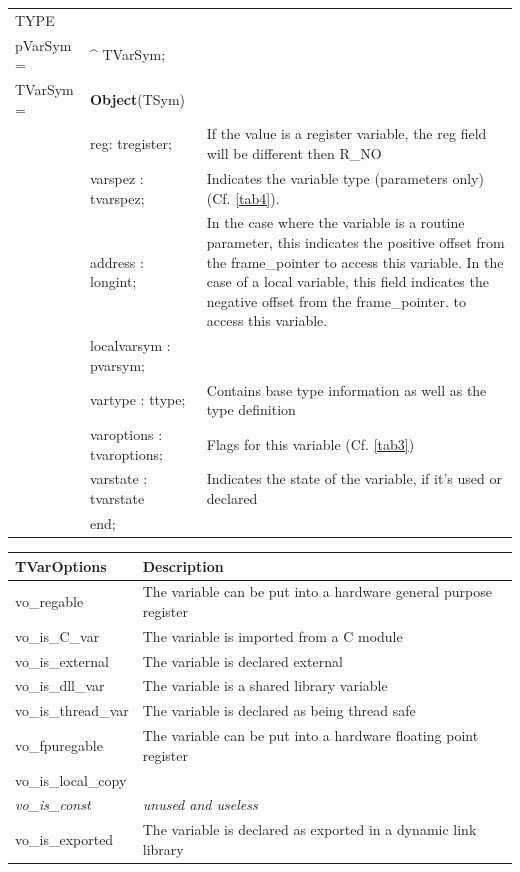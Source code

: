 \documentclass [12pt]{article}
\begin{document}
\begin{tabular*}{6.5in}{|l@{\extracolsep{\fill}}lp{9cm}|}
\hline
\textsf{TYPE}& & \\
\xspace pVarSym = & \^{}  TVarSym; & \\
\xspace \textsf{TVarSym} = & \textbf{Object}(TSym) & \\
& \textsf{reg: tregister;}& 
	If the value is a register variable, the \textsf{reg} field will be
	different then R{\_}NO \\
& \textsf{varspez : tvarspez;}& 
	Indicates the variable type (parameters only) (Cf. \ref{tab4}). \\
& \textsf{address : longint;}& 
	In the case where the variable is a routine parameter, this
	indicates the positive offset from the \textsf{frame{\_}pointer }to
	access this variable. In the case of a local variable, this field
	indicates the negative offset from the \textsf{frame{\_}pointer}. to
	access this variable. \\
& \textsf{localvarsym : pvarsym;}&  \\
& \textsf{vartype : ttype;}& 
	Contains base type information as well as the type definition \\
& \textsf{varoptions : tvaroptions;}& 
	Flags for this variable (Cf. \ref{tab3}) \\
& \textsf{varstate : tvarstate}& 
	Indicates the state of the variable, if it's used or declared \\
& \textsf{end;}&  \\
\hline
\end{tabular*}

\begin{longtable}{|l|p{10cm}|}
\hline
TVarOptions & Description \\
\hline
\endhead
\hline
\endfoot
\textsf{vo{\_}regable}& 
	The variable can be put into a hardware general purpose register \\
\textsf{vo{\_}is{\_}C{\_}var}& 
	The variable is imported from a C module \\
\textsf{vo{\_}is{\_}external}& 
	The variable is declared external \\
\textsf{vo{\_}is{\_}dll{\_}var}& 
	The variable is a shared library variable \\
\textsf{vo{\_}is{\_}thread{\_}var}& 
	The variable is declared as being thread safe \\
\textsf{vo{\_}fpuregable}& 
	The variable can be put into a hardware floating point register \\
\textsf{vo{\_}is{\_}local{\_}copy}&  \\
\textsf{\textit{vo{\_}is{\_}const}}& 
	\textit{unused and useless} \\
\textsf{vo{\_}is{\_}exported}& 
	The variable is declared as exported in a dynamic link library  
\end{longtable}
\end{document}
